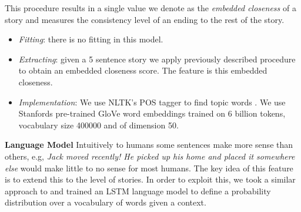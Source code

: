 \documentclass{article}
\begin{document}
This procedure results in a single value we denote as the \textit{embedded
    closeness} of a story and measures the consistency level of an ending to the
rest of the story.

\begin{itemize}
	\item \textit{Fitting}: there is no fitting in this model.
	\item \textit{Extracting}: given a 5 sentence story we apply previously described procedure to obtain an embedded closeness score. The feature is this embedded closeness.
	\item \textit{Implementation}: We use NLTK's POS tagger to find topic words \cite{NLTK_VADER}. We use Stanfords pre-trained GloVe word embeddings \cite{GLOVE} trained on 6 billion tokens, vocabulary size 400000  and of dimension 50.
\end{itemize}

\textbf{Language Model} Intuitively to humans some sentences make more sense
than others, e.g, \textit{Jack moved recently! He picked up his home and placed
    it somewhere else} would make little to no sense for most humans. The key
idea of this feature is to extend this to the level of stories. In order to
exploit this, we took a similar approach to \cite{UWNLP} and trained an LSTM
language model to define a probability distribution over a vocabulary of words
given a context. 
\end{document}
